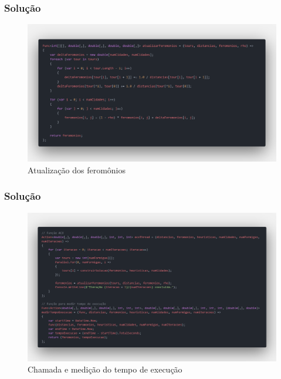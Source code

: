 \documentclass{beamer}
\begin{document}
	\begin{frame}
		\frametitle{Solução}
		\begin{figure}
			\centering
			\includegraphics[width=1\linewidth]{code update.png} %
			\caption{Atualização dos feromônios}
		\end{figure}
	\end{frame}
	
	\begin{frame}
		\frametitle{Solução}
		\begin{figure}
			\centering
			\includegraphics[width=1\linewidth]{code metric.png} %
			\caption{Chamada e medição do tempo de execução}
		\end{figure}
	\end{frame}
	
\end{document}
